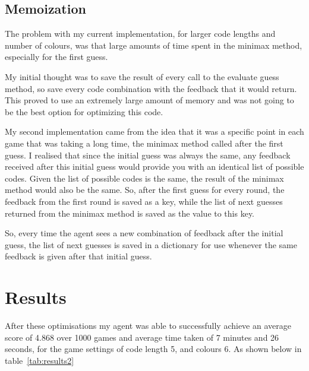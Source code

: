 \documentclass[12pt]{article}
\begin{document}


\subsection{Memoization}
The problem with my current implementation, for larger code lengths and number of colours, was that large amounts of time spent in the minimax method, especially for the first guess. 

My initial thought was to save the result of every call to the evaluate guess method, so save every code combination with the feedback that it would return. This proved to use an extremely large amount of memory and was not going to be the best option for optimizing this code.

My second implementation came from the idea that it was a specific point in each game that was taking a long time, the minimax method called after the first guess. I realised that since the initial guess was always the same, any feedback received after this initial guess would provide you with an identical list of possible codes. Given the list of possible codes is the same, the result of the minimax method would also be the same. So, after the first guess for every round, the feedback from the first round is saved as a key, while the list of next guesses returned from the minimax method is saved as the value to this key. 

So, every time the agent sees a new combination of feedback after the initial guess, the list of next guesses is saved in a dictionary for use whenever the same feedback is given after that initial guess. 

\section{Results}
After these optimisations my agent was able to successfully achieve an average score of 4.868 over 1000 games and average time taken of 7 minutes and 26 seconds, for the game settings of code length 5, and colours 6. As shown below in table~\ref{tab:results2}
\end{document}
